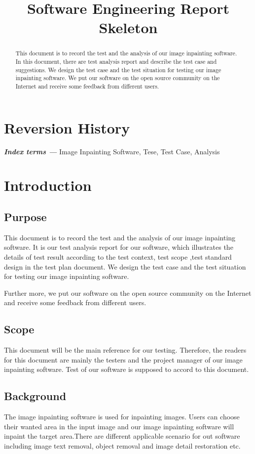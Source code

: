 \documentclass[12pt]{article}
\title{Software Engineering Report Skeleton}
\providecommand{\keywords}[1]{\textbf{\textit{Index terms ---}} #1}
\begin{document}
\maketitle

\section*{Reversion History}
\begin{abstract}
\qquad This document is to record the test and the analysis of our image inpainting software. In this document, there are test analysis report and describe the test case and suggestions. We design the test case and the test situation for testing our image inpainting software. We put our software on the open source community on the Internet and receive some feedback from different users.
\end{abstract}
\keywords{Image Inpainting Software, Tese, Test Case, Analysis}
\newpage
\tableofcontents
\newpage

\section{Introduction}
\subsection{Purpose}
\qquad This document is to record the test and the analysis of our image inpainting software. It is our test analysis report for our software, which illustrates the details of test result according to the test context, test scope ,test standard design in the test plan document. We design the test case and the test situation for testing our image inpainting software.

Further more, we put our software on the open source community on the Internet and receive some feedback from different users.
\subsection{Scope}
\qquad This document will be the main reference for our testing. Therefore, the readers for this document are mainly the testers and the project manager of our image inpainting software. Test of our software is supposed to accord to this document.
\subsection{Background}
\qquad The image inpainting software is used for inpainting images. Users can choose their wanted area in the input image and our image inpainting software will inpaint the target area.There are different applicable scenario for out software including image text removal, object removal and image detail restoration etc. 
\end{document}
